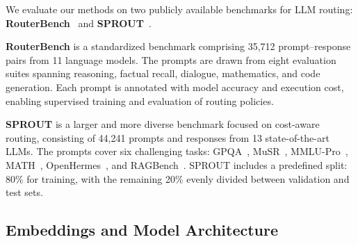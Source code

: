 \documentclass{article}
\theoremstyle{remark}
\begin{document}
We evaluate our methods on two publicly available benchmarks for LLM routing: \textbf{RouterBench}~\citep{hu2024routerbench} and \textbf{SPROUT}~\citep{somerstep2025carrot}.

\textbf{RouterBench} is a standardized benchmark comprising 35{,}712 prompt–response pairs from 11 language models. The prompts are drawn from eight evaluation suites spanning reasoning, factual recall, dialogue, mathematics, and code generation. Each prompt is annotated with model accuracy and execution cost, enabling supervised training and evaluation of routing policies.

\textbf{SPROUT} is a larger and more diverse benchmark focused on cost-aware routing, consisting of 44{,}241 prompts and responses from 13 state-of-the-art LLMs. The prompts cover six challenging tasks: GPQA~\citep{rein2024gpqa}, MuSR~\citep{sprague2023musr}, MMLU-Pro~\citep{wang2024mmlu}, MATH~\citep{hendrycks2021measuring}, OpenHermes~\citep{teknium2023openhermes}, and RAGBench~\citep{friel2407ragbench}. SPROUT includes a predefined split: 80\% for training, with the remaining 20\% evenly divided between validation and test sets.







\subsection{Embeddings and Model Architecture}
\end{document}
